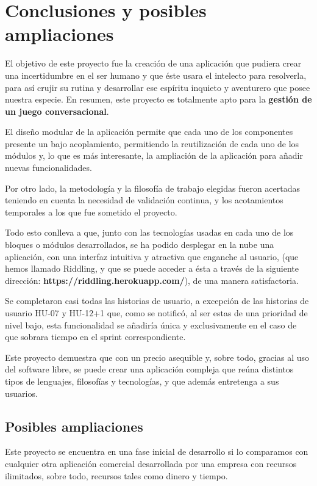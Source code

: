 \chapter{Conclusiones y posibles ampliaciones}

El objetivo de este proyecto fue la creación de una aplicación que pudiera crear una incertidumbre en el ser humano y que éste usara el intelecto para resolverla, para así crujir su rutina y desarrollar ese espíritu inquieto y aventurero que posee nuestra especie. En resumen, este proyecto es totalmente apto para la \textbf{gestión de un juego conversacional}. 

El diseño modular de la aplicación permite que cada uno de los componentes presente un bajo acoplamiento, permitiendo la reutilización de cada uno de los módulos y, lo que es más interesante, la ampliación de la aplicación para añadir nuevas funcionalidades. 

Por otro lado, la metodología y la filosofía de trabajo elegidas fueron acertadas teniendo en cuenta la necesidad de validación continua, y los acotamientos temporales a los que fue sometido el proyecto.

Todo esto conlleva a que, junto con las tecnologías usadas en cada uno de los bloques o módulos desarrollados, se ha podido desplegar en la nube una aplicación, con una interfaz intuitiva y atractiva que enganche al usuario, (que hemos llamado Riddling, y que se puede acceder a ésta a través de la siguiente dirección: \textbf{https://riddling.herokuapp.com/}), de una manera satisfactoria.

Se completaron casi todas las historias de usuario, a excepción de las historias de usuario HU-07 y HU-12+1 que, como se notificó, al ser estas de una prioridad de nivel bajo, esta funcionalidad se añadiría única y exclusivamente en el caso de que sobrara tiempo en el sprint correspondiente.

Este proyecto demuestra que con un precio asequible y, sobre todo, gracias al uso del software libre, se puede crear una aplicación compleja que reúna distintos tipos de lenguajes, filosofías y tecnologías, y que además entretenga a sus usuarios.

\section{Posibles ampliaciones}

Este proyecto se encuentra en una fase inicial de desarrollo si lo comparamos con cualquier otra aplicación comercial desarrollada por una empresa con recursos ilimitados, sobre todo, recursos tales como dinero y tiempo.

